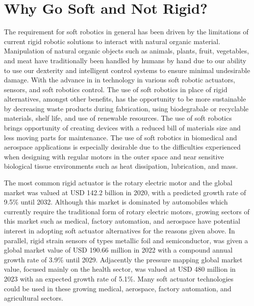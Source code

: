 \section{Why Go Soft and Not Rigid?}
The requirement for soft robotics in general has been driven by the limitations of current rigid robotic solutions to interact with natural organic material. Manipulation of natural organic objects such as animals, plants, fruit, vegetables, and meat have traditionally been handled by humans by hand due to our ability to use our dexterity and intelligent control systems to ensure minimal undesirable damage. With the advance in in technology in various soft robotic actuators\cite{Stella2023,Zhang2023,Hartmann2021,Yasa2023, Manti2016}, sensors\cite{Hegde2023}, and soft robotics control\cite{DellaSantina2023, Armanini2023}. The use of soft robotics in place of rigid alternatives, amongst other benefits, has the opportunity to be more sustainable by decreasing waste products during fabrication, using biodegrabale or recyclable materials, shelf life, and use of renewable resources\cite{Hartmann2021}. The use of soft robotics brings opportunity of creating devices with a reduced bill of materials size and less moving parts for maintenance. The use of soft robotics in biomedical and aerospace applications is especially desirable due to the difficulties experienced when designing with regular motors in the outer space and near sensitive biological tissue environments such as heat dissipation, lubrication, and mass\cite{Murugesan1981,Ashuri2020,Branz2017,Bruschi2021}. 

The most common rigid actuator is the rotary electric motor and the global market was valued at USD 142.2 billion in 2020, with a predicted growth rate of 9.5\% until 2032\cite{alliedmarketresearch}. Although this market is dominated by automobiles which currently require the traditional form of rotary electric motors, growing sectors of this market such as medical, factory automation, and aerospace have potential interest in adopting soft actuator alternatives for the reasons given above. In parallel, rigid strain sensors of types metallic foil and semiconductor, was given a global market value of USD 190.66 million in 2022 with a compound annual growth rate of 3.9\% until 2029\cite{maximizemarketresearch}. Adjacently the pressure mapping global market value, focused mainly on the health sector, was valued at USD 480 million in 2023 with an expected growth rate of 5.1\%\cite{usdanalytics,visualizeresearch}. Many soft actuator technologies could be used in these growing medical, aerospace, factory automation, and agricultural sectors.

